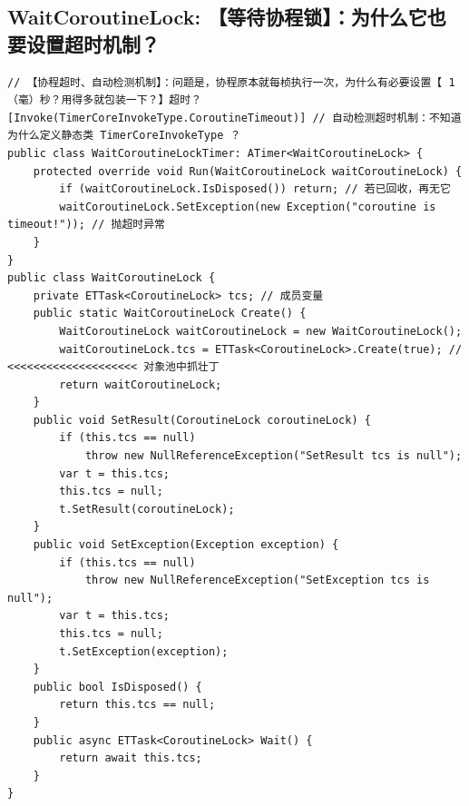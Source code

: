 \documentclass[9pt, b5paper]{article}
\begin{document}
\subsection{WaitCoroutineLock: 【等待协程锁】：为什么它也要设置超时机制？}
\label{sec-14-2}
\begin{verbatim}
// 【协程超时、自动检测机制】：问题是，协程原本就每桢执行一次，为什么有必要设置【 1 （毫）秒？用得多就包装一下？】超时？
[Invoke(TimerCoreInvokeType.CoroutineTimeout)] // 自动检测超时机制：不知道为什么定义静态类 TimerCoreInvokeType ？
public class WaitCoroutineLockTimer: ATimer<WaitCoroutineLock> {
    protected override void Run(WaitCoroutineLock waitCoroutineLock) {
        if (waitCoroutineLock.IsDisposed()) return; // 若已回收，再无它
        waitCoroutineLock.SetException(new Exception("coroutine is timeout!")); // 抛超时异常
    }
}
public class WaitCoroutineLock {
    private ETTask<CoroutineLock> tcs; // 成员变量 
    public static WaitCoroutineLock Create() {
        WaitCoroutineLock waitCoroutineLock = new WaitCoroutineLock();
        waitCoroutineLock.tcs = ETTask<CoroutineLock>.Create(true); // <<<<<<<<<<<<<<<<<<<< 对象池中抓壮丁
        return waitCoroutineLock;
    }
    public void SetResult(CoroutineLock coroutineLock) {
        if (this.tcs == null) 
            throw new NullReferenceException("SetResult tcs is null");
        var t = this.tcs;
        this.tcs = null;
        t.SetResult(coroutineLock);
    }
    public void SetException(Exception exception) {
        if (this.tcs == null) 
            throw new NullReferenceException("SetException tcs is null");
        var t = this.tcs;
        this.tcs = null;
        t.SetException(exception);
    }
    public bool IsDisposed() {
        return this.tcs == null;
    }
    public async ETTask<CoroutineLock> Wait() {
        return await this.tcs;
    }
}
\end{verbatim}
\end{document}

